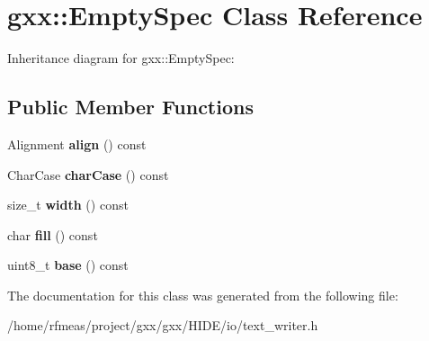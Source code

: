 \hypertarget{classgxx_1_1EmptySpec}{}\section{gxx\+:\+:Empty\+Spec Class Reference}
\label{classgxx_1_1EmptySpec}


Inheritance diagram for gxx\+:\+:Empty\+Spec\+:
\subsection*{Public Member Functions}
\begin{DoxyCompactItemize}
\item 
Alignment {\bfseries align} () const \hypertarget{classgxx_1_1EmptySpec_ab675d1c95d89c71a0bf9d7e9ada26e80}{}\label{classgxx_1_1EmptySpec_ab675d1c95d89c71a0bf9d7e9ada26e80}

\item 
Char\+Case {\bfseries char\+Case} () const \hypertarget{classgxx_1_1EmptySpec_af569cd5be978de22ddebbe0eebfc4ec4}{}\label{classgxx_1_1EmptySpec_af569cd5be978de22ddebbe0eebfc4ec4}

\item 
size\+\_\+t {\bfseries width} () const \hypertarget{classgxx_1_1EmptySpec_afc9e0c3e85b971c32eab0928a49bf309}{}\label{classgxx_1_1EmptySpec_afc9e0c3e85b971c32eab0928a49bf309}

\item 
char {\bfseries fill} () const \hypertarget{classgxx_1_1EmptySpec_ac74f7a8bb9d44c771b04a7d9b68ab486}{}\label{classgxx_1_1EmptySpec_ac74f7a8bb9d44c771b04a7d9b68ab486}

\item 
uint8\+\_\+t {\bfseries base} () const \hypertarget{classgxx_1_1EmptySpec_ab3e63ff4d910490a2c8ad5e2bbff16d0}{}\label{classgxx_1_1EmptySpec_ab3e63ff4d910490a2c8ad5e2bbff16d0}

\end{DoxyCompactItemize}


The documentation for this class was generated from the following file\+:\begin{DoxyCompactItemize}
\item 
/home/rfmeas/project/gxx/gxx/\+H\+I\+D\+E/io/text\+\_\+writer.\+h\end{DoxyCompactItemize}

